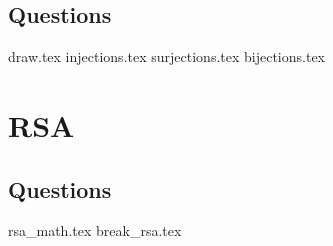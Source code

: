 \documentclass{exam}
\begin{document}
\subsection{Questions}
\begin{questions}
{draw.tex}
{injections.tex}
{surjections.tex}
{bijections.tex}
\end{questions}

\section{RSA}
\subsection{Questions}
\begin{questions}
{rsa_math.tex}
{break_rsa.tex}
\end{questions}
\end{document}
